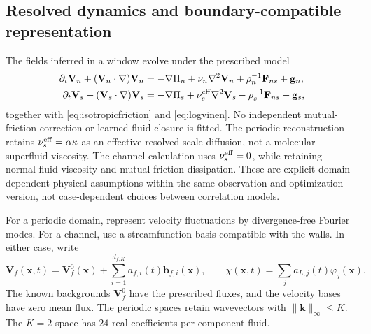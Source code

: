 \documentclass[11pt]{article}
\numberwithin{equation}{section}
\begin{document}
\subsection{Resolved dynamics and boundary-compatible representation}
\label{sec:discretization}

The fields inferred in a window evolve under the prescribed model
\begin{equation}
 \begin{aligned}
 \partial_t\mathbf V_n+(\mathbf V_n\cdot\nabla)\mathbf V_n
 &=-\nabla\Pi_n+\nu_n\nabla^2\mathbf V_n
   +\rho_n^{-1}\mathbf F_{ns}+\mathbf g_n,\\
 \partial_t\mathbf V_s+(\mathbf V_s\cdot\nabla)\mathbf V_s
 &=-\nabla\Pi_s+\nu_s^{\rm eff}\nabla^2\mathbf V_s
   -\rho_s^{-1}\mathbf F_{ns}+\mathbf g_s,
 \end{aligned}
 \label{eq:reconstructionPDE}
\end{equation}
together with \eqref{eq:isotropicfriction} and \eqref{eq:logvinen}. No independent mutual-friction correction or learned fluid closure is fitted. The periodic reconstruction retains $\nu_s^{\rm eff}=\alpha\kappa$ as an effective resolved-scale diffusion, not a molecular superfluid viscosity. The channel calculation uses $\nu_s^{\rm eff}=0$, while retaining normal-fluid viscosity and mutual-friction dissipation. These are explicit domain-dependent physical assumptions within the same observation and optimization version, not case-dependent choices between correlation models.

For a periodic domain, represent velocity fluctuations by divergence-free Fourier modes. For a channel, use a streamfunction basis compatible with the walls. In either case, write
\begin{equation}
 \mathbf V_f(\mathbf x,t)=\mathbf V_f^0(\mathbf x)
       +\sum_{i=1}^{d_{f,K}}a_{f,i}(t)\mathbf b_{f,i}(\mathbf x),
 \qquad
 \chi(\mathbf x,t)=\sum_j a_{L,j}(t)\varphi_j(\mathbf x).
 \label{eq:fieldexpansion}
\end{equation}
The known backgrounds $\mathbf V_f^0$ have the prescribed fluxes, and the velocity bases have zero mean flux. The periodic spaces retain wavevectors with $\|\mathbf k\|_\infty\leq K$. The $K=2$ space has $24$ real coefficients per component fluid.
\end{document}
